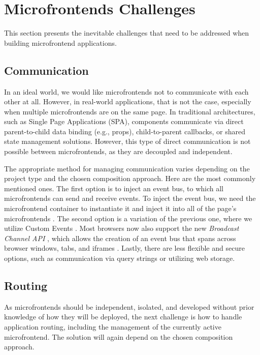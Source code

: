 \section{Microfrontends Challenges}
\label{sec:MicrofrontendsChallenges} 
This section presents the inevitable challenges that need to be addressed when building microfrontend applications.

\subsection{Communication}
In an ideal world, we would like microfrontends not to communicate with each other at all. However, in real-world applications, that is not the case, especially when multiple microfrontends are on the same page. In traditional architectures, such as Single Page Applications (SPA), components communicate via direct parent-to-child data binding (e.g., props), child-to-parent callbacks, or shared state management solutions. However, this type of direct communication is not possible between microfrontends, as they are decoupled and independent.

The appropriate method for managing communication varies depending on the project type and the chosen composition approach. Here are the most commonly mentioned ones. The first option is to inject an event bus, to which all microfrontends can send and receive events. To inject the event bus, we need the microfrontend container to instantiate it and inject it into all of the page's microfrontends \cite{MezzaliraBuildingMf}. The second option is a variation of the previous one, where we utilize Custom Events \cite{MDNCustomEvent, MezzaliraBuildingMf, Geers}. Most browsers now also support the new \emph{Broadcast Channel API} \cite{BroadcastChannelAPI}, which allows the creation of an event bus that spans across browser windows, tabs, and iframes \cite{Geers}. Lastly, there are less flexible and secure options, such as communication via query strings \cite{MezzaliraBuildingMf} or utilizing web storage.

\subsection{Routing}
As microfrontends should be independent, isolated, and developed without prior knowledge of how they will be deployed, the next challenge is how to handle application routing, including the management of the currently active microfrontend. The solution will again depend on the chosen composition approach.

